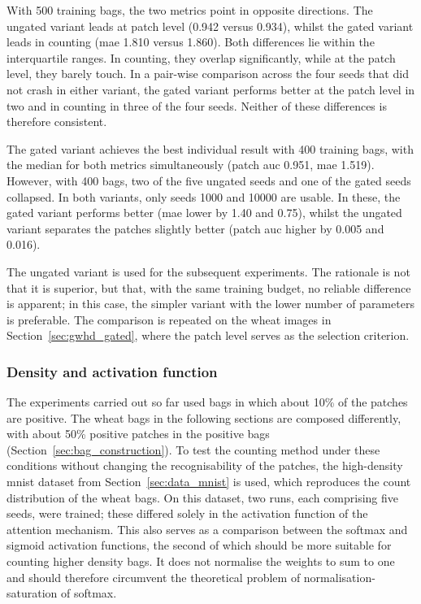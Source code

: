 \documentclass[12pt,parskip = half, DIV=classic,listof=totoc]{scrartcl}
\begin{document}
			With 500 training bags, the two metrics point in opposite directions. The
			ungated variant leads at patch level (0.942 versus 0.934), whilst the gated variant leads in
			counting (\ac{mae} 1.810 versus 1.860). Both differences lie within the
			interquartile ranges. In counting, they overlap significantly, while at the patch level, they
			barely touch. In a pair-wise comparison across the four seeds that did not
			crash in either variant, the gated variant performs better at the patch level in two and in counting in three
			of the four seeds. Neither of these differences is therefore consistent.

			The gated variant achieves the best individual result with 400 training bags, with the median
			for both metrics simultaneously (patch \ac{auc} 0.951, \ac{mae} 1.519). However, with 400 bags,
			two of the five ungated seeds and one of the gated seeds collapsed. In both variants,
			only seeds 1000 and 10000 are usable. In these, the gated variant performs better
			(\ac{mae} lower by 1.40 and 0.75), whilst the ungated variant separates the patches slightly better
			(patch \ac{auc} higher by 0.005 and 0.016). 

			The ungated variant is used for the subsequent experiments. The rationale
			is not that it is superior, but that, with the same
			training budget, no reliable difference is apparent; in this case, the
			simpler variant with the lower number of parameters is preferable. The comparison is repeated 
			on the wheat images in Section~\ref{sec:gwhd_gated}, where the patch level serves as the selection criterion.
			
		\subsubsection{Density and activation function}\label{sec:mnist_density}
			The experiments carried out so far used bags in which about 10\% of the patches
			are positive. The wheat bags in the following sections are composed differently,
			with about 50\% positive patches in the positive bags
			(Section~\ref{sec:bag_construction}). To test the counting method under these
			conditions without changing the recognisability of the patches, the high-density
			\ac{mnist} dataset from Section~\ref{sec:data_mnist} is used, which reproduces the
			count distribution of the wheat bags. On this dataset, two runs, each comprising five seeds, were trained; these differed solely in the activation function of the
			attention mechanism. This also serves as a comparison between the softmax and sigmoid activation functions, the second of which
			should be more suitable for counting higher density bags. It does not normalise the weights to sum to one and should therefore
			circumvent the theoretical problem of normalisation-saturation of softmax. 
\end{document}
